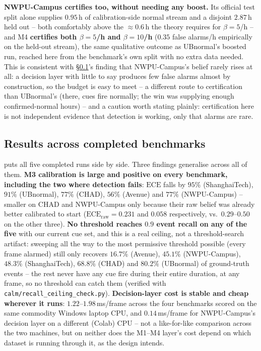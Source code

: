 \documentclass[conference]{IEEEtran}
\newcommand{\ece}{\mathrm{ECE}}
\begin{document}
\textbf{NWPU-Campus certifies too, without needing any boost.} Its official
test split alone supplies $0.95$\,h of calibration-side normal stream and a
disjoint $2.87$\,h held out -- both comfortably above the $\approx 0.6$\,h
the theory requires for $\beta{=}5$/h -- and M4 \textbf{certifies both
$\beta{=}5$/h and $\beta{=}10$/h} ($0.35$ false alarms/h empirically on the
held-out stream), the same qualitative outcome as UBnormal's boosted run,
reached here from the benchmark's own split with no extra data needed. This
is consistent with \S\ref{sec:crossbench}'s finding that NWPU-Campus's
belief rarely rises at all: a decision layer with little to say produces
few false alarms almost by construction, so the budget is easy to meet --
a different route to certification than UBnormal's (there, cues fire
normally; the win was supplying enough confirmed-normal hours) -- and a
caution worth stating plainly: certification here is not independent
evidence that detection is working, only that alarms are rare.

\subsection{Results across completed benchmarks}
\label{sec:crossbench}

 puts all five completed runs side by side. Three
findings generalise across all of them. \textbf{M3 calibration is large and
positive on every benchmark, including the two where detection fails}:
$\ece$ falls by $95\%$ (ShanghaiTech), $91\%$ (UBnormal), $77\%$ (CHAD),
$56\%$ (Avenue) and $77\%$ (NWPU-Campus) -- smaller on CHAD and NWPU-Campus
only because their raw belief was already better calibrated to start
($\ece_{\text{raw}}=0.231$ and $0.058$ respectively, vs.\ $0.29$--$0.50$ on
the other three). \textbf{No threshold reaches $0.9$ event recall on any of
the five} with our current cue set, and this is a real ceiling, not a
threshold-search artifact: sweeping all the way to the most permissive
threshold possible (every frame alarmed) still only recovers $16.7\%$
(Avenue), $45.1\%$ (NWPU-Campus), $48.3\%$ (ShanghaiTech), $68.8\%$ (CHAD)
and $80.2\%$ (UBnormal) of ground-truth events -- the rest never have any
cue fire during their entire duration, at any frame, so no
threshold can catch them (verified with \texttt{calm/recall\_ceiling\_check.py}).
\textbf{Decision-layer cost is stable
and cheap wherever it runs}: $1.22$--$1.98$\,ms/frame across the four
benchmarks scored on the same commodity Windows laptop CPU, and
$0.14$\,ms/frame for NWPU-Campus's decision layer on a different (Colab)
CPU -- not a like-for-like comparison across the two machines, but on
neither does the M1--M4 layer's cost depend on which dataset is running
through it, as the design intends.
\end{document}
